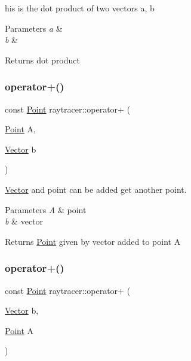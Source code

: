 his is the dot product of two vectors a, b 


\begin{DoxyParams}{Parameters}
{\em a} & \\
\hline
{\em b} & \\
\hline
\end{DoxyParams}
\begin{DoxyReturn}{Returns}
dot product 
\end{DoxyReturn}
\mbox{\label{group__api_gaad5be472789d2f603e44e25b5d835708}} 
\subsubsection{\texorpdfstring{operator+()}{operator+()}\hspace{0.1cm}{\footnotesize\ttfamily [1/3]}}
{\footnotesize\ttfamily const \hyperlink{classraytracer_1_1Point}{Point} raytracer\+::operator+ (\begin{DoxyParamCaption}\item[{\hyperlink{classraytracer_1_1Point}{Point}}]{A,  }\item[{\hyperlink{classraytracer_1_1Vector}{Vector}}]{b }\end{DoxyParamCaption})}



\hyperlink{classraytracer_1_1Vector}{Vector} and point can be added get another point. 


\begin{DoxyParams}{Parameters}
{\em A} & point \\
\hline
{\em b} & vector \\
\hline
\end{DoxyParams}
\begin{DoxyReturn}{Returns}
\hyperlink{classraytracer_1_1Point}{Point} given by vector added to point A 
\end{DoxyReturn}
\mbox{\label{group__api_ga4d268f6d854b65fc7b0c2b7331e233ae}} 
\subsubsection{\texorpdfstring{operator+()}{operator+()}\hspace{0.1cm}{\footnotesize\ttfamily [2/3]}}
{\footnotesize\ttfamily const \hyperlink{classraytracer_1_1Point}{Point} raytracer\+::operator+ (\begin{DoxyParamCaption}\item[{\hyperlink{classraytracer_1_1Vector}{Vector}}]{b,  }\item[{\hyperlink{classraytracer_1_1Point}{Point}}]{A }\end{DoxyParamCaption})}



